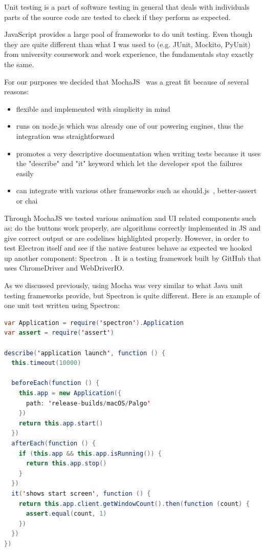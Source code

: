 \documentclass{l4proj}
\begin{document}
Unit testing is a part of software testing in general that deals with individuals parts of the source code are tested
to check if they perform as expected.

JavaScript provides a large pool of frameworks to do unit testing. Even though they are quite different than what I was
used to (e.g. JUnit, Mockito, PyUnit) from university coursework and work experience, the fundamentals stay exactly the
same.

For our purposes we decided that MochaJS~\cite{mocha} was a great fit because of several reasons:

\begin{itemize}
  \item flexible and implemented with simplicity in mind
  \item runs on node.js which was already one of our powering engines, thus the integration was straightforward
  \item promotes a very descriptive documentation when writing tests because it uses the "describe" and "it" keyword
    which let the developer spot the failures easily
  \item can integrate with various other frameworks such as should.js~\cite{shouldjs},
    better-assert~\cite{better-assert} or chai~\cite{chai}
\end{itemize}

Through MochaJS we tested various animation and UI related components such as: do the buttons work properly, are
algorithms correctly implemented in JS and give correct output or are codelines highlighted properly. However, in
order to test Electron itself and see if the native features behave as expected we hooked up another component:
Spectron~\cite{spectron}. It is a testing framework built by GitHub that uses ChromeDriver and WebDriverIO. 

As we discussed previously, using Mocha was very similar to what Java unit testing frameworks provide, but Spectron is
quite different. Here is an example of one unit test written using Spectron:

\pagebreak

\begin{lstlisting}[language=Java, caption=Spectron unit test which checks correct behaviour of the Electron window.]
var Application = require('spectron').Application
var assert = require('assert')

describe('application launch', function () {
  this.timeout(10000)

  beforeEach(function () {
    this.app = new Application({
      path: 'release-builds/macOS/Palgo'
    })
    return this.app.start()
  })
  afterEach(function () {
    if (this.app && this.app.isRunning()) {
      return this.app.stop()
    }
  })
  it('shows start screen', function () {
    return this.app.client.getWindowCount().then(function (count) {
      assert.equal(count, 1)
    })
  })
})
\end{lstlisting}
\end{document}

